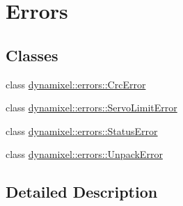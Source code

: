 \hypertarget{group__errors}{}\section{Errors}
\label{group__errors}
\subsection*{Classes}
\begin{DoxyCompactItemize}
\item 
class \hyperlink{classdynamixel_1_1errors_1_1_crc_error}{dynamixel\+::errors\+::\+Crc\+Error}
\item 
class \hyperlink{classdynamixel_1_1errors_1_1_servo_limit_error}{dynamixel\+::errors\+::\+Servo\+Limit\+Error}
\item 
class \hyperlink{classdynamixel_1_1errors_1_1_status_error}{dynamixel\+::errors\+::\+Status\+Error}
\item 
class \hyperlink{classdynamixel_1_1errors_1_1_unpack_error}{dynamixel\+::errors\+::\+Unpack\+Error}
\end{DoxyCompactItemize}


\subsection{Detailed Description}
